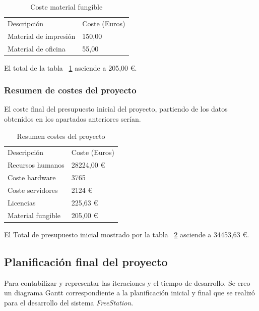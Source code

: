 \begin{table}[ht]
    \centering
    \begin{tabular}{|l|l|}
    \hline
        Descripción & Coste (Euros) \\
        Material de impresión & 150,00\\
        Material de oficina & 55,00 \\
      \hline
    \end{tabular}
    \caption{Coste material fungible}
     \label{tab:matfungible}
\end{table}

El total de la tabla ~\ref{tab:matfungible} asciende a 205,00 €.

\subsubsection{Resumen de costes del proyecto}

El coste final del presupuesto inicial del proyecto, partiendo de los datos
obtenidos en los apartados anteriores serían.

\begin{table}[ht]
    \centering
    \begin{tabular}{|l|l|}
    \hline
        Descripción & Coste (Euros) \\
        Recursos humanos & 28224,00 €\\
        Coste hardware & 3765\\
        Coste servidores & 2124 €\\
        Licencias &  225,63 € \\
        Material fungible & 205,00 € \\
      \hline
    \end{tabular}
    \caption{Resumen costes del proyecto}
     \label{tab:totalpresupuesto}
\end{table}

El Total de presupuesto inicial mostrado por la tabla
~\ref{tab:totalpresupuesto} asciende a 34453,63 €.

\subsection{Planificación final del proyecto}

Para contabilizar y representar las iteraciones y el tiempo de desarrollo. Se
creo un diagrama Gantt correspondiente a la
planificación inicial y final que se realizó para el desarrollo del sistema \emph{FreeStation}.

